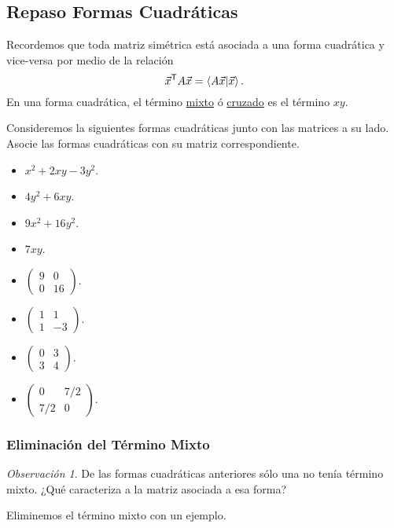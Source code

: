 \documentclass[12pt]{article}
\theoremstyle{plain}
\theoremstyle{definition}
\theoremstyle{remark}
\newtheorem*{Rmk}{Observación}      %
\newcommand{\sT}{\mathsf{T}}        %
\renewcommand{\:}{\colon}           %
\newcommand{\un}[1]{\underline{#1}}
\renewcommand{\.}{\Cdot}                %
\newcommand{\twobytwo}[4]{\begin{pmatrix} %
    #1 & #2 \\ #3 & #4 \end{pmatrix}}
\begin{document}
\begin{multicols}{2}

\subsection*{Repaso Formas Cuadráticas}

Recordemos que toda matriz simétrica está asociada a una forma cuadrática y vice-versa por medio de la relación 
$$\vec{x}^\sT A\vec{x}=\braket{A\vec{x}}{\vec{x}}.$$
En una forma cuadrática, el término \un{mixto} ó \un{cruzado} es el término $xy$.
\begin{ptcbP}
  Consideremos la siguientes formas cuadráticas junto con las matrices a su lado. Asocie las formas cuadráticas con su matriz correspondiente.
  \begin{multicols}{2}
  \begin{itemize}
    \item $x^2+2xy-3y^2$.
    \item $4y^2+6xy$.
    \item $9x^2+16y^2$.
    \item $7xy$.
  \end{itemize}
  \columnbreak
  \begin{itemize}
    \itemsep=-0.5em
    \item $\twobytwo{9}{0}{0}{16}$. %
    \item $\twobytwo{1}{1}{1}{-3}$. %
    \item $\twobytwo{0}{3}{3}{4}$. %
    \item $\twobytwo{0}{7/2}{7/2}{0}$. %
  \end{itemize}
\end{multicols}
\end{ptcbP}

\subsubsection*{Eliminación del Término Mixto}

\begin{Rmk}
De las formas cuadráticas anteriores sólo una no tenía término mixto. ¿Qué caracteriza a la matriz asociada a esa forma?
\end{Rmk}

Eliminemos el término mixto con un ejemplo.


\end{multicols}
\end{document}
